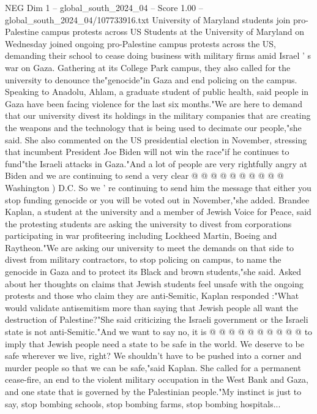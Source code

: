 \begin{textsample}{NEG Dim 1 – global\_south\_2024\_04 – Score 1.00 – global\_south\_2024\_04/107733916.txt}  \label{ex:f1_neg_416}
University of Maryland students join pro-Palestine campus protests across US Students at the University of Maryland on Wednesday joined ongoing pro-Palestine campus protests across the US, demanding their school to cease doing business with military firms amid Israel ' s war on Gaza.
Gathering at its College Park campus, they also called for the university to denounce the"genocide"in Gaza and end policing on the campus.
Speaking to Anadolu, Ahlam, a graduate student of public health, said people in Gaza have been facing violence for the last six months."We are here to demand that our university divest its holdings in the military companies that are creating the weapons and the technology that is being used to decimate our people,"she said.
She also commented on the US presidential election in November, stressing that incumbent President Joe Biden will not win the race"if he continues to fund"the Israeli attacks in Gaza."And a lot of people are very rightfully angry at Biden and we are continuing to send a very clear @ @ @ @ @ @ @ @ @ @ Washington ) D.C.
So we ' re continuing to send him the message that either you stop funding genocide or you will be voted out in November,"she added.
Brandee Kaplan, a student at the university and a member of Jewish Voice for Peace, said the protesting students are asking the university to divest from corporations participating in war profiteering including Lockheed Martin, Boeing and Raytheon."We are asking our university to meet the demands on that side to divest from military contractors, to stop policing on campus, to name the genocide in Gaza and to protect its Black and brown students,"she said.
Asked about her thoughts on claims that Jewish students feel unsafe with the ongoing protests and those who claim they are anti-Semitic, Kaplan responded :"What would validate antisemitism more than saying that Jewish people all want the destruction of Palestine?"She said criticizing the Israeli government or the Israeli state is not anti-Semitic."And we want to say no, it is @ @ @ @ @ @ @ @ @ @ to imply that Jewish people need a state to be safe in the world.
We deserve to be safe wherever we live, right?
We shouldn't have to be pushed into a corner and murder people so that we can be safe,"said Kaplan.
She called for a permanent cease-fire, an end to the violent military occupation in the West Bank and Gaza, and one state that is governed by the Palestinian people."My instinct is just to say, stop bombing schools, stop bombing farms, stop bombing hospitals...

\end{textsample}
